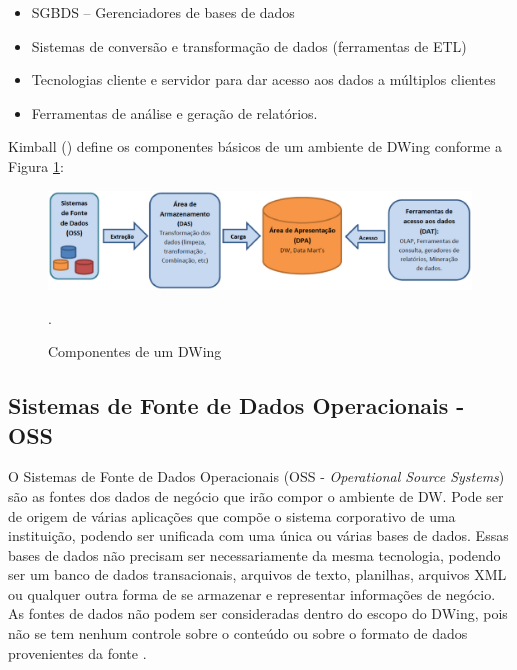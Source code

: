 %

\begin{itemize}
\item SGBDS – Gerenciadores de bases de dados
\item Sistemas de conversão e transformação de dados (ferramentas de ETL)
\item Tecnologias cliente e servidor para dar acesso aos dados a múltiplos clientes
\item Ferramentas de análise e geração de relatórios.
\end{itemize}

%

Kimball (\citeyear{kimball2002}) define os componentes básicos de um ambiente de DWing conforme a Figura \ref{componentesdw}:

%

 \begin{figure}[!htb]
 	\centering
 		\includegraphics[scale=0.5]{figuras/componentesDW}
 		\caption{Componentes de um DWing \cite{kimball2002}}.
 		\label{componentesdw}
 \end{figure}

%

\subsection{Sistemas de Fonte de Dados Operacionais - OSS}

O Sistemas de Fonte de Dados Operacionais (OSS - \emph{Operational Source Systems}) são as fontes dos dados de negócio que irão compor o ambiente de DW. Pode ser de origem de várias aplicações que compõe o sistema corporativo de uma instituição, podendo ser unificada com uma única ou várias bases de dados.  Essas bases de dados não precisam ser necessariamente da mesma tecnologia, podendo ser um banco de dados transacionais, arquivos de texto, planilhas, arquivos XML ou qualquer outra forma de se armazenar e representar informações de negócio. As fontes de dados não podem ser consideradas dentro do escopo do DWing, pois  não se tem nenhum controle sobre o conteúdo ou sobre o formato de dados provenientes da fonte \cite{kimball2002}.

